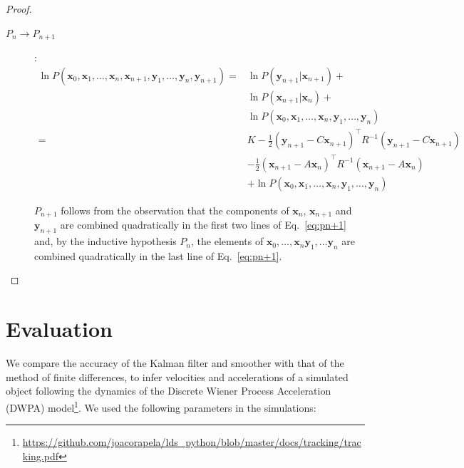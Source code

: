\documentclass[12pt]{article}
\begin{document}
\begin{proof}
\begin{description}
        \item[$P_n\rightarrow P_{n+1}$]:
            \begin{align}
                \ln P(\mathbf{x}_0, \mathbf{x}_1, \ldots, \mathbf{x}_n, \mathbf{x}_{n+1},\mathbf{y}_1, \ldots, \mathbf{y}_{n}, \mathbf{y}_{n+1})=&\ln P(\mathbf{y}_{n+1}|\mathbf{x}_{n+1})+\nonumber\\
                &\ln P(\mathbf{x}_{n+1}|\mathbf{x}_n)+\nonumber\\
                &\ln P(\mathbf{x}_0,\mathbf{x}_1,\ldots,\mathbf{x}_n,\mathbf{y}_1, \ldots, \mathbf{y}_{n})\nonumber\\
                =&K-\frac{1}{2}(\mathbf{y}_{n+1}-C\mathbf{x}_{n+1})^\intercal R^{-1}(\mathbf{y}_{n+1}-C\mathbf{x}_{n+1})\nonumber\\
                 &-\frac{1}{2}(\mathbf{x}_{n+1}-A\mathbf{x}_{n})^\intercal R^{-1}(\mathbf{x}_{n+1}-A\mathbf{x}_{n})\nonumber\\
                 &+\ln P(\mathbf{x}_0,\mathbf{x}_1,\ldots,\mathbf{x}_n,\mathbf{y}_1, \ldots, \mathbf{y}_{n})\label{eq:pn+1}
            \end{align}

            $P_{n+1}$ follows from the observation that the components of
            $\mathbf{x}_n$, $\mathbf{x}_{n+1}$ and $\mathbf{y}_{n+1}$ are combined
            quadratically in the first two lines of Eq.~\ref{eq:pn+1} and, by
            the inductive hypothesis $P_n$, the elements of
            $\mathbf{x}_0,\ldots,\mathbf{x}_n\mathbf{y}_1,\ldots\mathbf{y}_n$
            are combined quadratically in the last line of Eq.~\ref{eq:pn+1}.

    \end{description}

\end{proof}

\section{Evaluation}

We compare the accuracy of the Kalman filter and smoother with that of the
method of finite differences, to infer velocities and accelerations of a
simulated object following the dynamics of the Discrete Wiener Process
Acceleration (DWPA)
model\footnote{\url{https://github.com/joacorapela/lds_python/blob/master/docs/tracking/tracking.pdf}}.  We used the following parameters in the
simulations:
\end{document}
